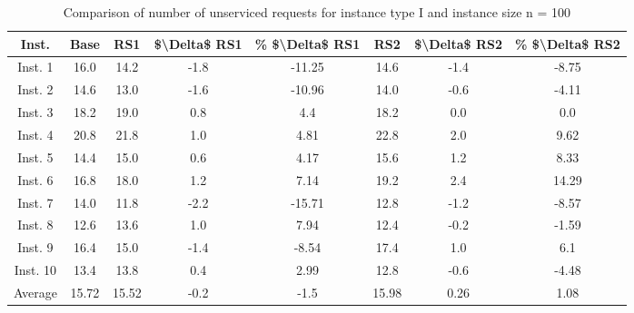 \begin{table}[H]
\centering
\begin{tabular}{cccccccc}
  \hline
  \textbf{Inst.} & \textbf{Base} & \textbf{RS1} & \textbf{\$\textbackslash{}Delta\$  RS1} & \textbf{\% \$\textbackslash{}Delta\$  RS1} & \textbf{RS2} & \textbf{\$\textbackslash{}Delta\$  RS2} & \textbf{\% \$\textbackslash{}Delta\$  RS2} \\\hline
  Inst. 1 & 16.0 & 14.2 & -1.8 & -11.25 & 14.6 & -1.4 & -8.75 \\
  Inst. 2 & 14.6 & 13.0 & -1.6 & -10.96 & 14.0 & -0.6 & -4.11 \\
  Inst. 3 & 18.2 & 19.0 & 0.8 & 4.4 & 18.2 & 0.0 & 0.0 \\
  Inst. 4 & 20.8 & 21.8 & 1.0 & 4.81 & 22.8 & 2.0 & 9.62 \\
  Inst. 5 & 14.4 & 15.0 & 0.6 & 4.17 & 15.6 & 1.2 & 8.33 \\
  Inst. 6 & 16.8 & 18.0 & 1.2 & 7.14 & 19.2 & 2.4 & 14.29 \\
  Inst. 7 & 14.0 & 11.8 & -2.2 & -15.71 & 12.8 & -1.2 & -8.57 \\
  Inst. 8 & 12.6 & 13.6 & 1.0 & 7.94 & 12.4 & -0.2 & -1.59 \\
  Inst. 9 & 16.4 & 15.0 & -1.4 & -8.54 & 17.4 & 1.0 & 6.1 \\
  Inst. 10 & 13.4 & 13.8 & 0.4 & 2.99 & 12.8 & -0.6 & -4.48 \\
  Average & 15.72 & 15.52 & -0.2 & -1.5 & 15.98 & 0.26 & 1.08 \\\hline
\end{tabular}
\caption{Comparison of number of unserviced requests for instance type I and instance size n = 100}
\label{tab:wait:resrelocation-nTaxi-comparison_I_100}
\end{table}

